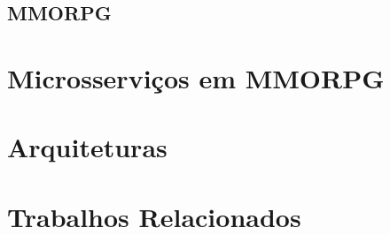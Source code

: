 \subsection{MMORPG}

\section{Microsserviços em MMORPG}
\label{sec:microsserviços_de_mmorpg}

\section{Arquiteturas}
\label{sec:arquiteturas}


\section{Trabalhos Relacionados}
\label{sec:similares}
